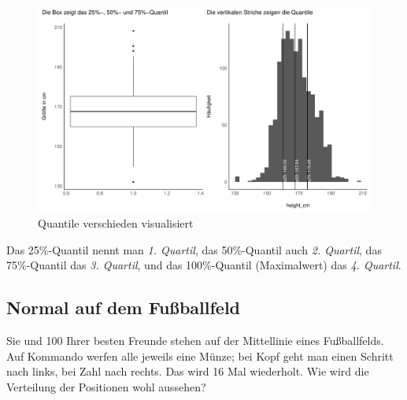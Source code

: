 \documentclass[
  a4paper,
  DIV=11]{scrreprt}
\theoremstyle{definition}
\theoremstyle{remark}
\begin{document}
\begin{figure}

{\centering \includegraphics{./Verteilungen_files/figure-pdf/fig-quantiles-1.pdf}

}

\caption{\label{fig-quantiles}Quantile verschieden visualisiert}

\end{figure}

\begin{tcolorbox}[enhanced jigsaw, leftrule=.75mm, left=2mm, bottomrule=.15mm, opacityback=0, coltitle=black, colbacktitle=quarto-callout-note-color!10!white, opacitybacktitle=0.6, rightrule=.15mm, toptitle=1mm, colback=white, colframe=quarto-callout-note-color-frame, arc=.35mm, toprule=.15mm, breakable, titlerule=0mm, bottomtitle=1mm, title=\textcolor{quarto-callout-note-color}{\faInfo}\hspace{0.5em}{Hinweis}]
Das 25\%-Quantil nennt man \emph{1. Quartil}, das 50\%-Quantil auch
\emph{2. Quartil}, das 75\%-Quantil das \emph{3. Quartil}, und das
100\%-Quantil (Maximalwert) das \emph{4. Quartil}.
\end{tcolorbox}

\hypertarget{normal-auf-dem-fuuxdfballfeld}{%
\subsection{Normal auf dem
Fußballfeld}\label{normal-auf-dem-fuuxdfballfeld}}

Sie und 100 Ihrer besten Freunde stehen auf der Mittellinie eines
Fußballfelds. Auf Kommando werfen alle jeweils eine Münze; bei Kopf geht
man einen Schritt nach links, bei Zahl nach rechts. Das wird 16 Mal
wiederholt. Wie wird die Verteilung der Positionen wohl aussehen?
\end{document}
